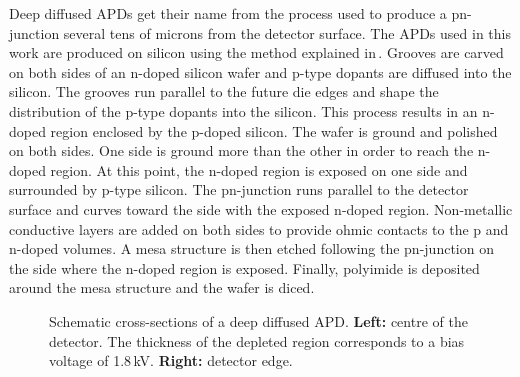 \documentclass{article}
\begin{document}
Deep diffused APDs get their name from the process used to produce a pn-junction several tens of microns from the detector surface.
The APDs used in this work are produced on silicon using the method explained in\,\cite{mcclish2004,apdPatent}.
Grooves are carved on both sides of an n-doped silicon wafer and p-type dopants are diffused into the silicon.
The grooves run parallel to the future die edges and shape the distribution of the p-type dopants into the silicon.
This process results in an n-doped region enclosed by the p-doped silicon.
The wafer is ground and polished on both sides.
One side is ground more than the other in order to reach the n-doped region.
At this point, the n-doped region is exposed on one side and surrounded by p-type silicon.
The pn-junction runs parallel to the detector surface and curves toward the side with the exposed n-doped region.
Non-metallic conductive layers are added on both sides to provide ohmic contacts to the p and n-doped volumes.
A mesa structure is then etched following the pn-junction on the side where the n-doped region is exposed.
Finally, polyimide is deposited around the mesa structure and the wafer is diced.

\begin{figure}
  \centering
  \hfill
  \caption{Schematic cross-sections of a deep diffused APD. {\bf Left:} centre of the detector. The thickness of the depleted region corresponds to a bias voltage of 1.8\,kV. {\bf Right:} detector edge.}
  \label{fig:apdDia}
\end{figure}
\end{document}
